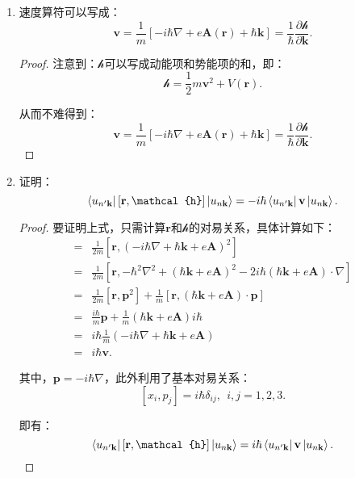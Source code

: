 \documentclass[reqno,a4paper,12pt]{amsart}
\begin{document}
\begin{enumerate}
\item 速度算符可以写成：
\[
	\mathbf{v} = \frac{1}{m}[-i\hbar\nabla + e\mathbf{A}(\mathbf{r}) + \hbar\mathbf{k}] = \frac{1}{\hbar}\frac{\partial \mathcal{h}}{\partial \mathbf{k}}.
\]

\begin{proof}
注意到：$\mathcal{h}$可以写成动能项和势能项的和，即：
\[
	\mathcal{h} = \frac{1}{2}m \mathbf{v}^2 + V(\mathbf{r}).
\]

从而不难得到：
\[
	\mathbf{v} = \frac{1}{m}[-i\hbar\nabla + e\mathbf{A}(\mathbf{r}) + \hbar\mathbf{k}] = \frac{1}{\hbar}\frac{\partial \mathcal{h}}{\partial \mathbf{k}}.
\]
\end{proof}


\item 证明：
\[
	\bra{u_{n'\mathbf{k}}} [\mathbf{r}, \mathcal{h}] \ket{u_{n\mathbf{k}}} = -i\hbar \bra{u_{n'\mathbf{k}}} \mathbf{v} \ket{u_{n\mathbf{k}}}.
\]

\begin{proof}
要证明上式，只需计算$\mathbf{r}$和$\mathcal{h}$的对易关系，具体计算如下：
\begin{align*}
	[\mathbf{r}, \mathcal{h}] =& \frac{1}{2m}[\mathbf{r}, (-i\hbar\nabla + \hbar\mathbf{k} + e\mathbf{A})^2] \\
	=& \frac{1}{2m} [\mathbf{r}, -\hbar^2\nabla^2 + (\hbar\mathbf{k} + e\mathbf{A})^2 - 2i\hbar(\hbar\mathbf{k} + e\mathbf{A}) \cdot \nabla] \\
	=& \frac{1}{2m}[\mathbf{r}, \mathbf{p}^2] + \frac{1}{m}[\mathbf{r}, (\hbar\mathbf{k}+e\mathbf{A}) \cdot \mathbf{p}] \\
	=& \frac{i\hbar}{m} \mathbf{p} + \frac{1}{m} (\hbar\mathbf{k} + e\mathbf{A}) i\hbar \\
	=& i\hbar \frac{1}{m}(-i\hbar\nabla + \hbar\mathbf{k} + e\mathbf{A}) \\
	=& i\hbar \mathbf{v}.
\end{align*}

其中，$\mathbf{p} = -i\hbar\nabla$，此外利用了基本对易关系：
\[
	[x_i, p_j] = i\hbar\delta_{ij}, \ \ i,j = 1,2,3.
\]

即有：
\[
	\bra{u_{n'\mathbf{k}}} [\mathbf{r}, \mathcal{h}] \ket{u_{n\mathbf{k}}} = i\hbar \bra{u_{n'\mathbf{k}}} \mathbf{v} \ket{u_{n\mathbf{k}}}.
\]
\end{proof}

\end{enumerate}
\end{document}
